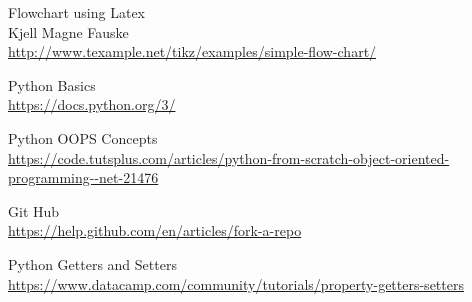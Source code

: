 \documentclass[12pt]{article}
\begin{document}
  
\newpage
\begin{thebibliography}{11}
Flowchart using Latex\\
Kjell Magne Fauske \\
\url{http://www.texample.net/tikz/examples/simple-flow-chart/}

Python Basics \\
\url{https://docs.python.org/3/}

Python OOPS Concepts\\
\url{https://code.tutsplus.com/articles/python-from-scratch-object-oriented-programming--net-21476}

Git Hub\\
\url{https://help.github.com/en/articles/fork-a-repo}

Python Getters and Setters\\
\url{https://www.datacamp.com/community/tutorials/property-getters-setters}

\end{thebibliography}

   
   
\end{document}
